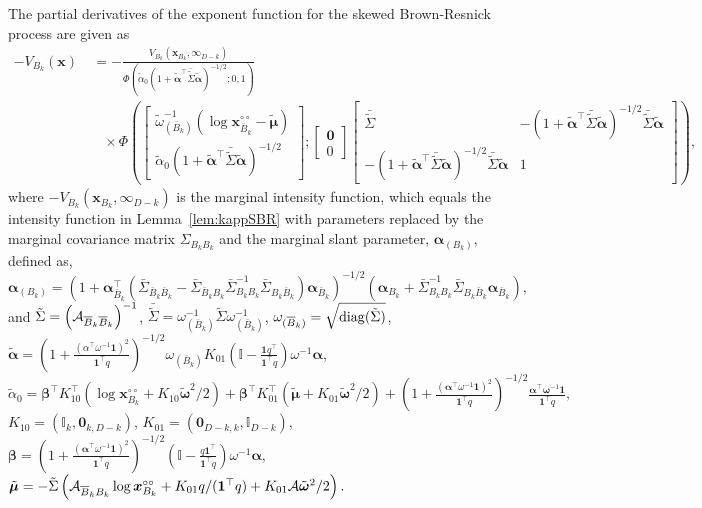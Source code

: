 \documentclass[lineno]{biometrika}
\begin{document}
\begin{lemma}\label{lem:partial_BR}
The partial derivatives of the exponent function for the skewed Brown-Resnick process are given as
\begin{align*}
-V_{B_k}(\bm x) &\ =  - \frac{V_{B_k}(\bm x_{B_k},\bm \infty_{D-k})}{\Phi\left(\tilde\alpha_0\left(1+\tilde{\bm\alpha}^\top\bar{\tilde\Sigma}\tilde{\bm\alpha}\right)^{-1/2}; 0, 1\right)} \\
& \quad \times 
\Phi\left(
\begin{bmatrix} 
\tilde\omega^{-1}_{(\bar B_k)}(\log \bm x_{\bar B_k}^{\circ\circ} - \tilde{\bm\mu})  \\
\tilde\alpha_0(1+\tilde{\bm\alpha}^\top\bar{\tilde\Sigma}\tilde{\bm\alpha})^{-1/2}
\end{bmatrix};
\begin{bmatrix}
\bm 0 \\ 0
\end{bmatrix}
\begin{bmatrix}
	\bar{\tilde\Sigma} & -(1+\tilde{\bm\alpha}^\top\bar{\tilde\Sigma}\tilde{\bm\alpha})^{-1/2}\bar{\tilde\Sigma}\tilde{\bm\alpha} \\
-(1+\tilde{\bm\alpha}^\top\bar{\tilde\Sigma}\tilde{\bm\alpha})^{-1/2}\bar{\tilde\Sigma}\tilde{\bm\alpha} &	1
\end{bmatrix} 
\right), 
\end{align*}
where $-V_{B_k}(\bm x_{B_k}, \bm \infty_{D-k})$ is the marginal intensity function, which equals the intensity function in Lemma~\ref{lem:kappSBR} with parameters replaced by the marginal covariance matrix $\Sigma_{B_kB_k}$ and the marginal slant parameter, $\bm\alpha_{(B_k)}$, defined as, 
$$\bm\alpha_{(B_k)} = \left(1+\bm\alpha_{\bar B_k}^\top\left(\bar\Sigma_{\bar B_k\bar B_k} -\bar \Sigma_{\bar B_k B_k}\bar\Sigma_{B_kB_k}^{-1}\bar\Sigma_{B_k\bar B_k}\right)\bm \alpha_{\bar B_k}\right)^{-1/2}\left(\bm \alpha_{B_k} + \bar\Sigma_{B_kB_k}^{-1}\bar\Sigma_{B_k\bar B_k}\bm\alpha_{\bar B_k}\right),$$
and
$\tilde\Sigma = \left({\mathcal A}_{{\overline{B}}_k{\overline{B}}_k}\right)^{-1}$, 
$\bar{\tilde\Sigma} = \omega_{(\bar B_k)}^{-1}\tilde\Sigma\omega_{(\bar B_k)}^{-1}$, $\omega_{({\overline{B}}_k)}=\sqrt{{\rm diag}(\tilde\Sigma)}$,
$\tilde{\bm\alpha}=\left(1 + \frac{\left(\alpha^\top\omega^{-1}\bm 1\right)^2}{\bm 1^\top q}\right)^{-1/2}\omega_{(\bar B_k)} K_{01}\left(\mathbb{I} - \frac{\bm 1 q^\top}{\bm 1^\top q}\right)\omega^{-1}\bm\alpha$,
$\tilde\alpha_0 = \bm\beta^\top K_{10}^\top(\log \bm x_{B_k}^{\circ\circ}+K_{10}\tilde{\bm\omega}^2/2) + \bm\beta^\top K_{01}^\top(\tilde{\bm\mu} + K_{01}\tilde{\bm\omega}^2/2) +  \left(1 + \frac{(\bm\alpha^\top\omega^{-1}\bm 1)^2}{\bm 1^\top q}\right)^{-1/2}\frac{\bm\alpha^\top\bm\omega^{-1}\bm 1}{\bm 1^\top q},$ 
$K_{10} = (\mathbb I_{k},\bm 0_{k,D-k})$, 
$K_{01} = (\bm 0_{D-k,k},\mathbb I_{D-k})$, 
$\bm\beta = \left(1 + \frac{(\bm\alpha^\top\omega^{-1}\bm 1)^2}{\bm 1^\top q}\right)^{-1/2}\left(\mathbb I - \frac{q\bm 1^\top}{\bm 1^\top q}\right)\omega^{-1}\bm\alpha$, $\tilde{\bm\mu} = -\tilde\Sigma\left({\mathcal A}_{{\overline{B}}_kB_k}\log \bm x_{B_k}^{\circ\circ} + K_{01}q/(\bm 1^\top q)+K_{01}{\mathcal A}\tilde{\bm\omega}^2/2\right).$
\end{lemma}
\end{document}
